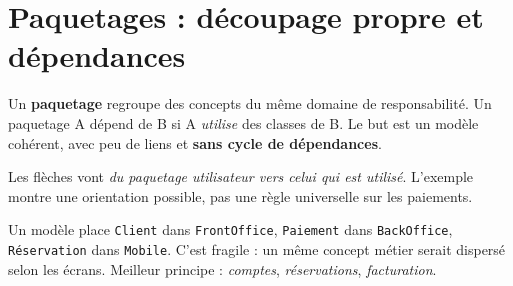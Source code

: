 \documentclass[10pt,a4paper]{article}
\begin{document}
\section{Paquetages : découpage propre et dépendances}
Un \textbf{paquetage} regroupe des concepts du même domaine de responsabilité. Un paquetage A dépend de B si A \emph{utilise} des classes de B. Le but est un modèle cohérent, avec peu de liens et \textbf{sans cycle de dépendances}.
\begin{center}
\end{center}
Les flèches vont \emph{du paquetage utilisateur vers celui qui est utilisé}. L'exemple montre une orientation possible, pas une règle universelle sur les paiements.
\begin{exobox}
Un modèle place \texttt{Client} dans \texttt{FrontOffice}, \texttt{Paiement} dans \texttt{BackOffice}, \texttt{Réservation} dans \texttt{Mobile}. C'est fragile : un même concept métier serait dispersé selon les écrans. Meilleur principe : \emph{comptes}, \emph{réservations}, \emph{facturation}.\end{exobox}
\end{document}

